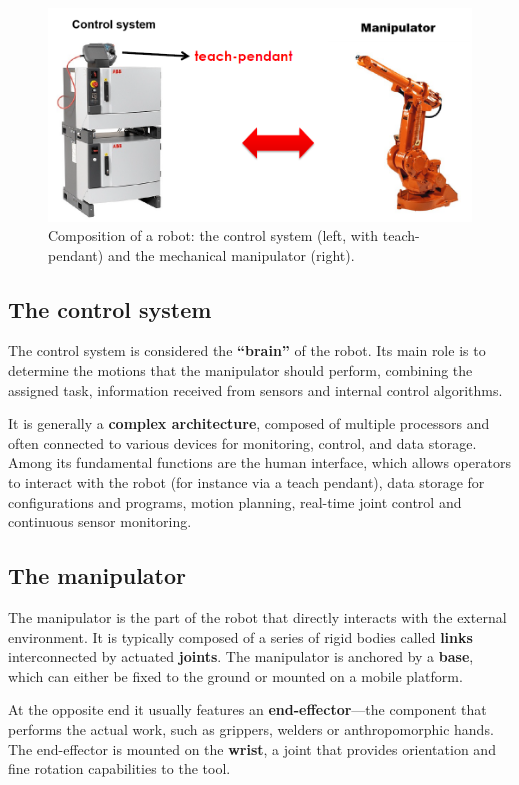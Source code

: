 \begin{figure}[H]
  \centering
  \includegraphics[width=0.7\linewidth]{imgs/robotic_arm_structure.png}
  \caption{Composition of a robot: the control system (left, with teach-pendant) and the mechanical manipulator (right).}
\end{figure}

\hfill

\subsection{The control system}

The control system is considered the \textbf{``brain''} of the robot. Its main role is to determine the motions that the manipulator should perform, combining the assigned task, information received from sensors and internal control algorithms.

It is generally a \textbf{complex architecture}, composed of multiple processors and often connected to various devices for monitoring, control, and data storage. Among its fundamental functions are the human interface, which allows operators to interact with the robot (for instance via a teach pendant), data storage for configurations and programs, motion planning, real-time joint control and continuous sensor monitoring.

\hfill

\subsection{The manipulator}

The manipulator is the part of the robot that directly interacts with the external environment. It is typically composed of a series of rigid bodies called \textbf{links} interconnected by actuated \textbf{joints}. The manipulator is anchored by a \textbf{base}, which can either be fixed to the ground or mounted on a mobile platform.

At the opposite end it usually features an \textbf{end-effector}—the component that performs the actual work, such as grippers, welders or anthropomorphic hands. The end-effector is mounted on the \textbf{wrist}, a joint that provides orientation and fine rotation capabilities to the tool.

